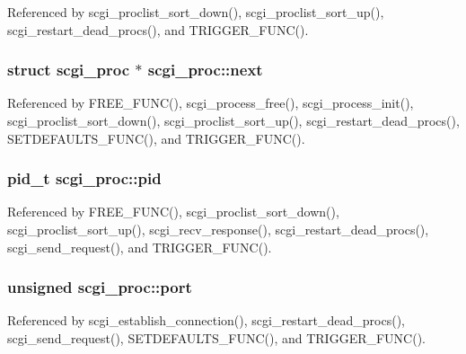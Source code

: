 Referenced by scgi\-\_\-proclist\-\_\-sort\-\_\-down(), scgi\-\_\-proclist\-\_\-sort\-\_\-up(), scgi\-\_\-restart\-\_\-dead\-\_\-procs(), and T\-R\-I\-G\-G\-E\-R\-\_\-\-F\-U\-N\-C().

\hypertarget{structscgi__proc_aa97160627b2702e3c5249d5fe2083893}{
\subsubsection[{next}]{\setlength{\rightskip}{0pt plus 5cm}struct {\bf scgi\-\_\-proc} $\ast$ scgi\-\_\-proc\-::next}}\label{structscgi__proc_aa97160627b2702e3c5249d5fe2083893}


Referenced by F\-R\-E\-E\-\_\-\-F\-U\-N\-C(), scgi\-\_\-process\-\_\-free(), scgi\-\_\-process\-\_\-init(), scgi\-\_\-proclist\-\_\-sort\-\_\-down(), scgi\-\_\-proclist\-\_\-sort\-\_\-up(), scgi\-\_\-restart\-\_\-dead\-\_\-procs(), S\-E\-T\-D\-E\-F\-A\-U\-L\-T\-S\-\_\-\-F\-U\-N\-C(), and T\-R\-I\-G\-G\-E\-R\-\_\-\-F\-U\-N\-C().

\hypertarget{structscgi__proc_a95b096cdf28e86fd91b41043c70997c8}{
\subsubsection[{pid}]{\setlength{\rightskip}{0pt plus 5cm}pid\-\_\-t scgi\-\_\-proc\-::pid}}\label{structscgi__proc_a95b096cdf28e86fd91b41043c70997c8}


Referenced by F\-R\-E\-E\-\_\-\-F\-U\-N\-C(), scgi\-\_\-proclist\-\_\-sort\-\_\-down(), scgi\-\_\-proclist\-\_\-sort\-\_\-up(), scgi\-\_\-recv\-\_\-response(), scgi\-\_\-restart\-\_\-dead\-\_\-procs(), scgi\-\_\-send\-\_\-request(), and T\-R\-I\-G\-G\-E\-R\-\_\-\-F\-U\-N\-C().

\hypertarget{structscgi__proc_a01546bbb3cf9a34a11cd28f9db430561}{
\subsubsection[{port}]{\setlength{\rightskip}{0pt plus 5cm}unsigned scgi\-\_\-proc\-::port}}\label{structscgi__proc_a01546bbb3cf9a34a11cd28f9db430561}


Referenced by scgi\-\_\-establish\-\_\-connection(), scgi\-\_\-restart\-\_\-dead\-\_\-procs(), scgi\-\_\-send\-\_\-request(), S\-E\-T\-D\-E\-F\-A\-U\-L\-T\-S\-\_\-\-F\-U\-N\-C(), and T\-R\-I\-G\-G\-E\-R\-\_\-\-F\-U\-N\-C().

